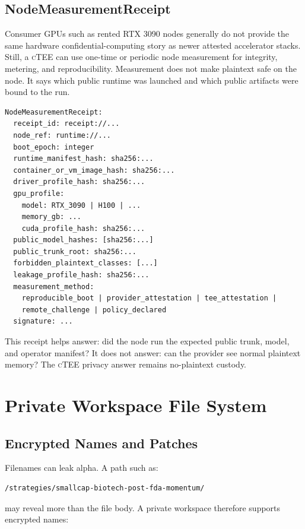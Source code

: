 \documentclass[11pt]{article}
\newcommand{\ctee}{\textnormal{\textsc{cTEE}}}
\begin{document}
\subsection{NodeMeasurementReceipt}

Consumer GPUs such as rented RTX 3090 nodes generally do not provide the same
hardware confidential-computing story as newer attested accelerator stacks.
Still, a \ctee{} can use one-time or periodic node measurement for integrity,
metering, and reproducibility. Measurement does not make plaintext safe on the
node. It says which public runtime was launched and which public artifacts were
bound to the run.

\begin{Verbatim}[fontsize=\small]
NodeMeasurementReceipt:
  receipt_id: receipt://...
  node_ref: runtime://...
  boot_epoch: integer
  runtime_manifest_hash: sha256:...
  container_or_vm_image_hash: sha256:...
  driver_profile_hash: sha256:...
  gpu_profile:
    model: RTX_3090 | H100 | ...
    memory_gb: ...
    cuda_profile_hash: sha256:...
  public_model_hashes: [sha256:...]
  public_trunk_root: sha256:...
  forbidden_plaintext_classes: [...]
  leakage_profile_hash: sha256:...
  measurement_method:
    reproducible_boot | provider_attestation | tee_attestation |
    remote_challenge | policy_declared
  signature: ...
\end{Verbatim}

This receipt helps answer: did the node run the expected public trunk, model,
and operator manifest? It does not answer: can the provider see normal
plaintext memory? The \ctee{} privacy answer remains no-plaintext custody.

\section{Private Workspace File System}

\subsection{Encrypted Names and Patches}

Filenames can leak alpha. A path such as:

\begin{Verbatim}[fontsize=\small]
/strategies/smallcap-biotech-post-fda-momentum/
\end{Verbatim}

\noindent may reveal more than the file body. A private workspace therefore
supports encrypted names:
\end{document}
